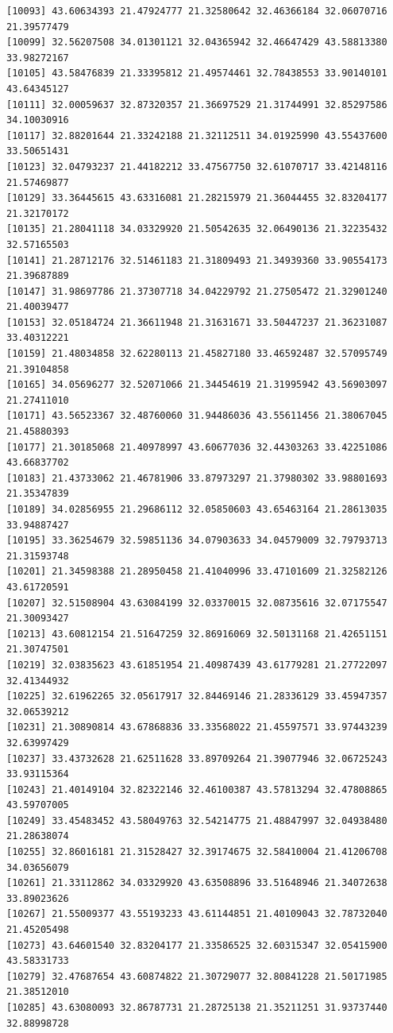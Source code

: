 \documentclass[
  letterpaper,
  DIV=11,
  numbers=noendperiod]{scrartcl}
\begin{document}
\begin{verbatim}
[10093] 43.60634393 21.47924777 21.32580642 32.46366184 32.06070716 21.39577479
[10099] 32.56207508 34.01301121 32.04365942 32.46647429 43.58813380 33.98272167
[10105] 43.58476839 21.33395812 21.49574461 32.78438553 33.90140101 43.64345127
[10111] 32.00059637 32.87320357 21.36697529 21.31744991 32.85297586 34.10030916
[10117] 32.88201644 21.33242188 21.32112511 34.01925990 43.55437600 33.50651431
[10123] 32.04793237 21.44182212 33.47567750 32.61070717 33.42148116 21.57469877
[10129] 33.36445615 43.63316081 21.28215979 21.36044455 32.83204177 21.32170172
[10135] 21.28041118 34.03329920 21.50542635 32.06490136 21.32235432 32.57165503
[10141] 21.28712176 32.51461183 21.31809493 21.34939360 33.90554173 21.39687889
[10147] 31.98697786 21.37307718 34.04229792 21.27505472 21.32901240 21.40039477
[10153] 32.05184724 21.36611948 21.31631671 33.50447237 21.36231087 33.40312221
[10159] 21.48034858 32.62280113 21.45827180 33.46592487 32.57095749 21.39104858
[10165] 34.05696277 32.52071066 21.34454619 21.31995942 43.56903097 21.27411010
[10171] 43.56523367 32.48760060 31.94486036 43.55611456 21.38067045 21.45880393
[10177] 21.30185068 21.40978997 43.60677036 32.44303263 33.42251086 43.66837702
[10183] 21.43733062 21.46781906 33.87973297 21.37980302 33.98801693 21.35347839
[10189] 34.02856955 21.29686112 32.05850603 43.65463164 21.28613035 33.94887427
[10195] 33.36254679 32.59851136 34.07903633 34.04579009 32.79793713 21.31593748
[10201] 21.34598388 21.28950458 21.41040996 33.47101609 21.32582126 43.61720591
[10207] 32.51508904 43.63084199 32.03370015 32.08735616 32.07175547 21.30093427
[10213] 43.60812154 21.51647259 32.86916069 32.50131168 21.42651151 21.30747501
[10219] 32.03835623 43.61851954 21.40987439 43.61779281 21.27722097 32.41344932
[10225] 32.61962265 32.05617917 32.84469146 21.28336129 33.45947357 32.06539212
[10231] 21.30890814 43.67868836 33.33568022 21.45597571 33.97443239 32.63997429
[10237] 33.43732628 21.62511628 33.89709264 21.39077946 32.06725243 33.93115364
[10243] 21.40149104 32.82322146 32.46100387 43.57813294 32.47808865 43.59707005
[10249] 33.45483452 43.58049763 32.54214775 21.48847997 32.04938480 21.28638074
[10255] 32.86016181 21.31528427 32.39174675 32.58410004 21.41206708 34.03656079
[10261] 21.33112862 34.03329920 43.63508896 33.51648946 21.34072638 33.89023626
[10267] 21.55009377 43.55193233 43.61144851 21.40109043 32.78732040 21.45205498
[10273] 43.64601540 32.83204177 21.33586525 32.60315347 32.05415900 43.58331733
[10279] 32.47687654 43.60874822 21.30729077 32.80841228 21.50171985 21.38512010
[10285] 43.63080093 32.86787731 21.28725138 21.35211251 31.93737440 32.88998728

\end{verbatim}
\end{document}
